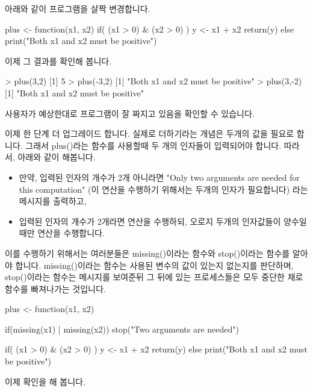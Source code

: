 아래와 같이 프로그램을 살짝 변경합니다. 

\begin{Schunk}
\begin{Soutput}
plus <- function(x1, x2){
	if( (x1 > 0) & (x2 > 0) ){
		y <- x1 + x2
		return(y)
	}
	else print("Both x1 and x2 must be positive")
}
\end{Soutput}
\end{Schunk}

이제 그 결과를 확인해 봅니다. 

\begin{Schunk}
\begin{Soutput}
> plus(3,2)
[1] 5
> plus(-3,2)
[1] "Both x1 and x2 must be positive"
> plus(3,-2)
[1] "Both x1 and x2 must be positive"
\end{Soutput}
\end{Schunk}

사용자가 예상한대로 프로그램이 잘 짜지고 있음을 확인할 수 있습니다. 

이제 한 단계 더 업그레이드 합니다. 
실제로 더하기라는 개념은 두개의 값을 필요로 합니다. 
그래서 plus()라는 함수를 사용할때 두 개의 인자들이 입력되어야 합니다.
따라서, 아래와 같이 해봅니다.

\begin{itemize}
\item 만약, 입력된 인자의 개수가 2개 아니라면 "Only two arguments are needed for this computation" (이 연산을 수행하기 위해서는 두개의 인자가 필요합니다) 라는 메시지를 출력하고, 
\item 입력된 인자의 개수가 2개라면 연산을 수행하되, 오로지 두개의 인자값들이 양수일때만 연산을 수행합니다. 
\end{itemize}

이를 수행하기 위해서는 여러분들은 missing()이라는 함수와 stop()이라는 함수를 알아야 합니다. 
missing()이라는 함수는 사용된 변수의 값이 있는지 없는지를 판단하며, stop()이라는 함수는 메시지를 보여준뒤 그 뒤에 있는 프로세스들은 모두 중단한 채로 함수를 빠져나가는 것입니다. 

\begin{Schunk}
\begin{Soutput}
plus <- function(x1, x2){
	if(missing(x1) | missing(x2)) stop("Two arguments are needed")
	
	if( (x1 > 0) & (x2 > 0) ){
		y <- x1 + x2
		return(y)
	}
	else print("Both x1 and x2 must be positive")
}
\end{Soutput}
\end{Schunk}

이제 확인을 해 봅니다. 

